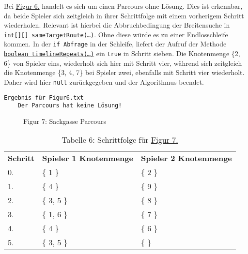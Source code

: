 \documentclass[a4paper,10pt,ngerman]{scrartcl}
\begin{document}
    Bei \hyperref[fig:Figure6]{Figur 6.} handelt es sich um einen Parcours ohne Lösung.
    Dies ist erkennbar, da beide Spieler sich zeitgleich in ihrer Schrittfolge mit einem vorherigem Schritt wiederholen.
    Relevant ist hierbei die Abbruchbedingung der Breitensuche in 
    \hyperref[lst:sameTargetRoute]{\texttt{int[][] sameTargetRoute(\ldots)}}.
    Ohne diese würde es zu einer Endlosschleife kommen.
    In der \texttt{if Abfrage} in der Schleife, liefert der Aufruf der Methode \hyperref[lst:timelineRepeats]{\texttt{boolean timelineRepeats(\ldots)}} ein \texttt{true} in Schritt sieben.
    Die Knotenmenge \{2, 6\} von Spieler eins, wiederholt sich hier mit Schritt vier, 
    während sich zeitgleich die Knotenmenge \{3, 4, 7\} bei Spieler zwei, ebenfalls mit Schritt vier wiederholt.
    Daher wird hier \texttt{null} zurückgegeben und der Algorithmus beendet.
    
    \begin{lstlisting}[frame=single, title=Programmausgabe Figur 6., breaklines=true]
  Ergebnis für Figur6.txt
	Der Parcours hat keine Lösung!
    \end{lstlisting}
    
	
    \begin{figure}[h!]
        \centering
        \FigurSieben{}
        \caption{Figur 7: Sackgasse Parcours}
        \label{fig:Figure7}
    \end{figure}

    \begin{table}[h!]
        \centering
        \begin{tabular}{lll}
            \textbf{Schritt} & \textbf{Spieler 1 Knotenmenge} & \textbf{Spieler 2 Knotenmenge} \\
            0.               & \{ 1 \}                        & \{ 2 \}                        \\
            1.               & \{  4 \}                         & \{  9 \}                         \\
            2.               & \{  3, 5 \}                      & \{  8 \}                         \\
            3.               & \{  1, 6 \}                      & \{  7 \}                         \\
            4.               & \{  4 \}                         & \{  6 \}                         \\
            5.               & \{  3, 5 \}                      & \{  \}                           \\
        \end{tabular}
        \caption{Tabelle 6: Schrittfolge für \hyperref[fig:Figure7]{Figur 7.}}
        \label{tab:Table6}
    \end{table}
\end{document}
